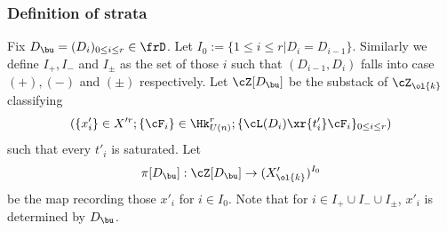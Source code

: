 \subsubsection{Definition of strata} Fix $D_{\bu}=(D_{i})_{0\le i\le r}\in \frD$. Let $I_{0} :=\{1\le i\le r|D_{i}=D_{i-1}\}$. Similarly we define $I_{+}, I_{-}$ and $I_{\pm}$ as the set of those $i$ such that $(D_{i-1}, D_{i})$ falls into case $(+),(-)$ and $(\pm)$  respectively. Let $\cZ[D_{\bu}]$ be the substack of $\cZ_{\ol{k}}$ classifying
\[
(\{x'_{i}\}\in X'^{r}; \{\cF_{i}\}\in \Hk^{r}_{U(n)}; \{\cL(D_{i})\xr{t'_{i}}\cF_{i}\}_{0\le i\le r})
\]
such that every $t'_{i}$ is saturated. Let
\begin{equation}
\pi[D_{\bu}]: \cZ[D_{\bu}]\to  (X'_{\ol{k}})^{I_{0}}
\end{equation}
be the map recording those $x'_{i}$ for $i\in I_{0}$. Note that for $i\in I_{+}\cup I_{-}\cup I_{\pm}$, $x'_{i}$ is determined by $D_{\bu}$.





